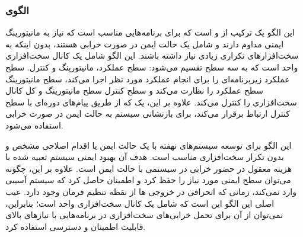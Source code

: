 \subsubsection{الگوی }
\label{ArmoushMix3LvlSafeMonSec}
\begin{RTL}
این الگو یک ترکیب از 
و  است که برای برنامه‌هایی
مناسب است که نیاز به مانیتورینگ ایمنی مداوم دارند و شامل یک حالت
ایمن در صورت خرابی هستند، بدون اینکه به سخت‌افزارهای تکراری
زیادی نیاز داشته باشند. این الگو شامل یک کانال سخت‌افزاری
واحد است که به سه سطح تقسیم می‌شود: سطح عملکرد،
مانیتورینگ و کنترل. سطح عملکرد زیربرنامه‌ای را برای
انجام عملکرد مورد نظر اجرا می‌کند، سطح مانیتورینگ سطح عملکرد
را نظارت می‌کند و سطح کنترل سطح مانیتورینگ و کل کانال
سخت‌افزاری را کنترل می‌کند. علاوه بر این، یک  که
از طریق پیام‌های دوره‌ای با سطح کنترل ارتباط برقرار می‌کند،
برای بازنشانی سیستم به حالت ایمن در صورت خرابی استفاده می‌شود.
\end{RTL}
\begin{RTL}
این الگو برای توسعه سیستم‌های نهفته با یک حالت ایمن یا اقدام
اصلاحی مشخص و بدون تکرار سخت‌افزاری مناسب است.
هدف آن بهبود ایمنی سیستم تعبیه شده با هزینه معقول
در حضور خرابی در سیستمی با حالت ایمن است.
علاوه بر این، چگونه می‌توان سطح ایمنی مورد نیاز را حفظ کرد و
اطمینان حاصل کرد که سیستم آسیبی وارد نمی‌کند،
زمانی که انحرافی در خروجی ها از نقطه تنظیم فرمان وجود دارد.
عیب اصلی این الگو این است که شامل یک کانال سخت‌افزاری واحد
است؛ بنابراین، نمی‌توان از آن برای تحمل خرابی‌های سخت‌افزاری
در برنامه‌هایی با نیازهای بالای قابلیت اطمینان و دسترسی استفاده کرد.
\end{RTL}
